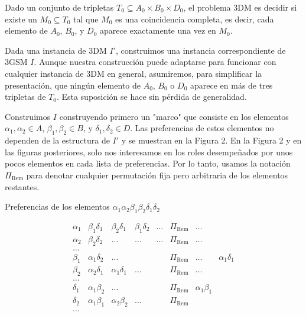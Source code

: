 \documentclass{article}
\begin{document}
Dado un conjunto de tripletas $T_0 \subseteq A_0 \times B_0 \times D_0$, el problema 3DM es decidir si existe un $M_0 \subseteq T_0$ tal que $M_0$ es una coincidencia completa, es decir, cada elemento de $A_0$, $B_0$, y $D_0$ aparece exactamente una vez en $M_0$.

Dada una instancia de 3DM $I'$, construimos una instancia correspondiente de 3GSM $I$. Aunque nuestra construcción puede adaptarse para funcionar con cualquier instancia de 3DM en general, asumiremos, para simplificar la presentación, que ningún elemento de $A_0$, $B_0$ o $D_0$ aparece en más de tres tripletas de $T_0$. Esta suposición se hace sin pérdida de generalidad.

Construimos $I$ construyendo primero un "marco" que consiste en los elementos $\alpha_1, \alpha_2 \in A$, $\beta_1, \beta_2 \in B$, y $\delta_1, \delta_2 \in D$.
Las preferencias de estos elementos no dependen de la estructura de $I'$ y se muestran en la Figura 2. En la Figura 2 y en las figuras posteriores, solo nos interesamos en los roles desempeñados por unos pocos elementos en cada lista de preferencias.
Por lo tanto, usamos la notación $\Pi_{\text{Rem}}$ para denotar cualquier permutación fija pero arbitraria de los elementos restantes.



\begin{table}[h]
    \centering
    \caption{Preferencias de los elementos $\alpha_1 \alpha_2 \beta_1 \beta_2 \delta_1 \delta_2$}
    \[
    \begin{array}{c|cccccccc}
        \alpha_1 & \beta_1\delta_1 & \beta_2\delta_1 & \beta_1\delta_2 & \dots & \Pi_{\text{Rem}} & \dots \\
        \alpha_2 & \beta_2\delta_2 & \dots & \dots &\dots & \Pi_{\text{Rem}} & \dots \\
        \dots & & & & &  \\
        \hline
        \beta_1 & \alpha_1\delta_2 & \dots & & & \Pi_{\text{Rem}} & \dots & \alpha_1\delta_1 \\
        \beta_2 & \alpha_2\delta_1 & \alpha_1\delta_1 & \dots & &  \Pi_{\text{Rem}} & \dots \\
        \dots & & & & & \\
        \hline
        \delta_1 & \alpha_1\beta_2 & \dots &  & & \Pi_{\text{Rem}} & \alpha_1\beta_1 \\
        \delta_2 & \alpha_1\beta_1&  \alpha_2\beta_2 & \dots & & \Pi_{\text{Rem}} \\
        \dots & & & & & \\
    \end{array}
    \]
    \end{table}
\end{document}
